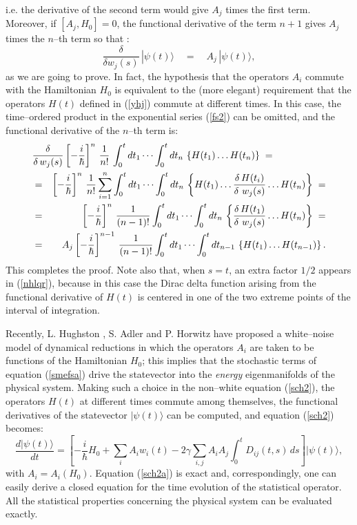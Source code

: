 \documentclass[10pt,a4paper]{article}
\begin{document}
i.e. the derivative of the second term would give $A_{j}$ times
the first term. Moreover, if $[A_{j}, H_{0}] = 0$, the functional
derivative of the term $n+1$ gives $A_{j}$ times the $n$--th term
so that :
\begin{equation} \label{nhlqr}
\frac{\delta}{\delta w_{j}(s)}\, |\psi(t)\rangle \quad = \quad
A_{j}\, |\psi(t)\rangle,
\end{equation}
as we are going to prove. In fact, the hypothesis that the
operators $A_{i}$ commute with the Hamiltonian $H_{0}$ is
equivalent to the (more elegant) requirement that the operators
$H(t)$ defined in (\ref{yhj}) commute at different times. In this
case, the time--ordered product in the exponential series
(\ref{fs2}) can be omitted, and the functional derivative of the
$n$--th term is:
\begin{eqnarray}
\lefteqn{\frac{\delta}{\delta\, w_{j}(s)} \left[-\frac{i}{\hbar}
\right]^{n}\, \frac{1}{n!} \, \int_{0}^{t} dt_{1} \cdots
\int_{0}^{t} dt_{n}\, \left\{H(t_{1}) \ldots H(t_{n}) \right\} \;
=}
\nonumber \\
& = & \left[-\frac{i}{\hbar}\right]^{n}\, \frac{1}{n!}
\sum_{i=1}^{n} \int_{0}^{t} dt_{1} \cdots  \int_{0}^{t} dt_{n}\,
\left\{H(t_{1}) \ldots \frac{\delta\, H(t_{i})}{\delta\ w_{j}(s)}
\ldots H(t_{n})
\right\}\; = \nonumber \\
& = & \left[-\frac{i}{\hbar}\right]^{n}\, \frac{1}{(n-1)!}
\int_{0}^{t} dt_{1} \cdots  \int_{0}^{t} dt_{n}\, \left\{
\frac{\delta\, H(t_{1})}{\delta\ w_{j}(s)} \ldots H(t_{n})
\right\}\; = \nonumber \\
& = & A_{j} \left[-\frac{i}{\hbar}\right]^{n-1}\, \frac{1}{(n-1)!}
\int_{0}^{t} dt_{1} \cdots  \int_{0}^{t} dt_{n-1}\, \left\{
H(t_{1}) \ldots H(t_{n-1}) \right\}.
\end{eqnarray}
This completes the proof. Note also that, when $s=t$, an extra
factor $1/2$ appears in (\ref{nhlqr}), because in this case the
Dirac delta function arising from the functional derivative of
$H(t)$ is centered in one of the two extreme points of the
interval of integration.

Recently, L. Hughston \cite{hugh}, S. Adler and P. Horwitz
\cite{ad1, ad2} have proposed a white--noise model of dynamical
reductions in which the operators $A_{i}$ are taken to be
functions of the Hamiltonian $H_{0}$; this implies that the
stochastic terms of equation (\ref{smefsa}) drive the statevector
into the {\it energy} eigenmanifolds of the physical system.
Making such a choice in the non--white equation (\ref {sch2}), the
operators $H(t)$ at different times commute among themselves, the
functional derivatives of the statevector $|\psi(t)\rangle$ can be
computed, and equation (\ref{sch2}) becomes:
\begin{equation}\label{sch2a}
\frac{d|\psi(t)\rangle}{dt} =  \left[ -\frac{i}{\hbar} H_{0} +
\sum_{i} A_{i} w_{i}(t) - 2\gamma \sum_{i,j}A_{i} A_{j}
\int_{0}^{t} D_{ij}(t,s)\,ds \right] |\psi(t)\rangle,
\end{equation}
with $A_{i} = A_{i}(H_{0})$. Equation (\ref{sch2a}) is exact and,
correspondingly, one can easily derive a closed equation for the
time evolution of the statistical operator. All the statistical
properties concerning the physical system can be evaluated
exactly.
\end{document}
